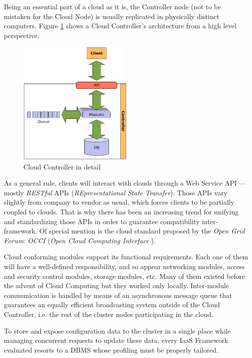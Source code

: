 Being an essential part of a cloud as it is, the Controller node (not to be mistaken for the Cloud Node) is usually replicated in physically distinct computers. Figure \ref{fig:cloudcontroller} shows a Cloud Controller's architecture from a high level perspective.

\begin{figure}[tbp]
\begin{center}
\includegraphics[width=0.5\textwidth]{imagenes/005.pdf}
 \caption{Cloud Controller in detail}
\label{fig:cloudcontroller}
\end{center}
\end{figure}

As a general rule, clients will interact with clouds through a Web Service API --- mostly \emph{RESTful} APIs (\emph{REpresentational State Transfer}). Those APIs vary slightly from company to vendor as usual, which forces clients to be partially coupled to clouds. That is why there has been an increasing trend for unifying and standardizing those APIs in order to guarantee compatibility inter-framework. Of special mention is the cloud standard proposed by the \emph{Open Grid Forum}: \emph{OCCI} (\emph{Open Cloud Computing Interface} \cite{occisdraft}).

Cloud conforming modules support its functional requirements. Each one of them will have a well-defined responsibility, and so appear networking modules, access and security control modules, storage modules, etc. Many of them existed before the advent of Cloud Computing but they worked only locally. Inter-module communication is handled by means of an asynchronous message queue that guarantees an equally efficient broadcasting system outside of the Cloud Controller, i.e. the rest of the cluster nodes participating in the cloud.

To store and expose configuration data to the cluster in a single place while managing concurrent requests to update these data, every IaaS Framework evaluated resorts to a DBMS whose profiling must be properly tailored.

